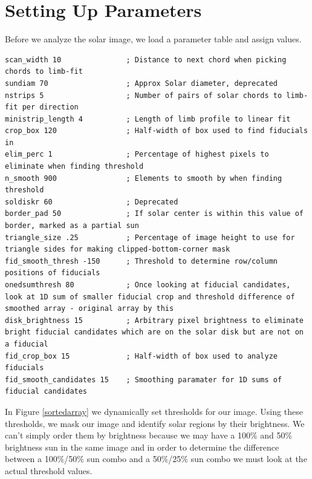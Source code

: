 \documentclass[10pt]{scrartcl}
\begin{document}

\section{Setting Up Parameters} %
\label{sec:setting_up_parameters}
Before we analyze the solar image, we load a parameter table and assign values. 

\begin{lstlisting}
scan_width 10               ; Distance to next chord when picking chords to limb-fit
sundiam 70                  ; Approx Solar diameter, deprecated
nstrips 5                   ; Number of pairs of solar chords to limb-fit per direction
ministrip_length 4          ; Length of limb profile to linear fit
crop_box 120                ; Half-width of box used to find fiducials in
elim_perc 1                 ; Percentage of highest pixels to eliminate when finding threshold
n_smooth 900                ; Elements to smooth by when finding threshold 
soldiskr 60                 ; Deprecated
border_pad 50               ; If solar center is within this value of border, marked as a partial sun
triangle_size .25           ; Percentage of image height to use for triangle sides for making clipped-bottom-corner mask
fid_smooth_thresh -150      ; Threshold to determine row/column positions of fiducials
onedsumthresh 80            ; Once looking at fiducial candidates, look at 1D sum of smaller fiducial crop and threshold difference of smoothed array - original array by this
disk_brightness 15          ; Arbitrary pixel brightness to eliminate bright fiducial candidates which are on the solar disk but are not on a fiducial
fid_crop_box 15             ; Half-width of box used to analyze fiducials
fid_smooth_candidates 15    ; Smoothing paramater for 1D sums of fiducial candidates 
\end{lstlisting}

In Figure \ref{sortedarray} we dynamically set thresholds for our image. Using these thresholds, we mask our image and identify solar regions by their brightness. We can't simply order them by brightness because we may have a 100\% and 50\% brightness sun in the same image and in order to determine the difference between a 100\%/50\% sun combo and a 50\%/25\% sun combo we must look at the actual threshold values.
\end{document}
